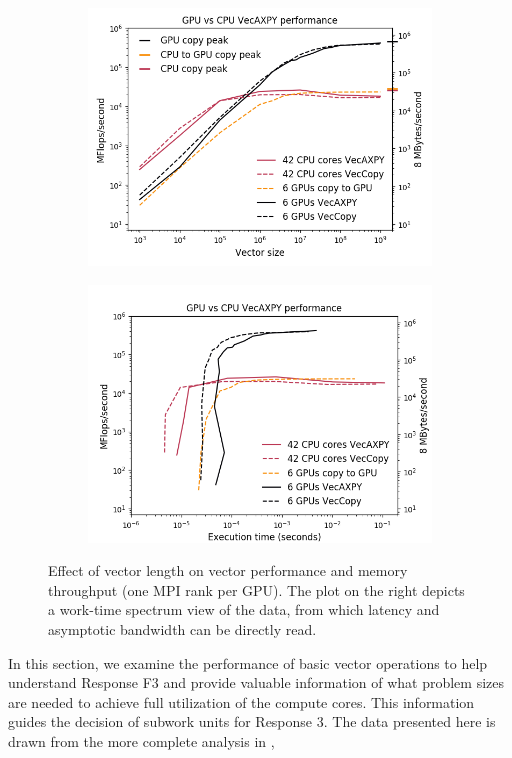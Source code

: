 \documentclass[5p,times]{elsarticle}
\begin{document}
\begin{figure}[ht]
    \centering
    \begin{subfigure}[t]{0.4 \textwidth}
    \vskip 0pt
    \includegraphics[width=\columnwidth]{figures/summitreport1/VecAXPY_CPU_vs_GPU.png}
    \end{subfigure}
    \begin{subfigure}[t]{0.4 \textwidth}
    \vskip 0pt
    \includegraphics[width=\columnwidth]{figures/summitreport1/jed_VecAXPY_CPU_vs_GPU.png}
    \end{subfigure}
    \caption{Effect of vector length on vector performance and memory throughput (one MPI rank per GPU).
    The plot on the right depicts a work-time spectrum view \cite{ChangPerformanceSpectrum,ChangTASSpectrum} of the data,
    from which latency and asymptotic bandwidth can be directly read.}
    \label{fig:vec_CPU_vs_GPU}
\end{figure}
%
In this section, we examine the performance of  basic vector operations to help understand Response F3 and
provide valuable information of what problem sizes are needed to achieve full utilization of the compute
cores. This information guides the decision of subwork units for Response 3.
The data presented here is drawn from the more complete analysis in \cite{osti_1614879},
\end{document}
